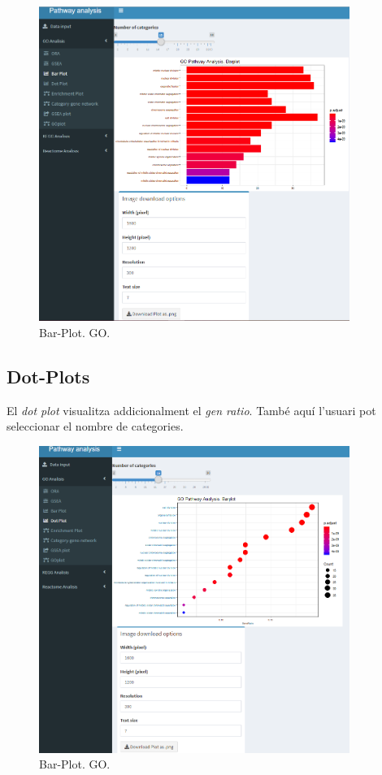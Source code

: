 \begin{figure}[H]
\centering
\includegraphics[width=0.9\textwidth]{figures/App_F14_Items_GO_BarPlot.png} 
\caption{Bar-Plot. GO.}
\end{figure}

\subsection{Dot-Plots}

El \textit{dot plot} visualitza addicionalment el \textit{gen ratio}. També aquí l'usuari pot seleccionar el nombre de categories.


\begin{figure}[H]
\centering
\includegraphics[width=0.9\textwidth]{figures/App_F15_Items_GO_DotPlot.png} 
\caption{Bar-Plot. GO.}
\end{figure}

